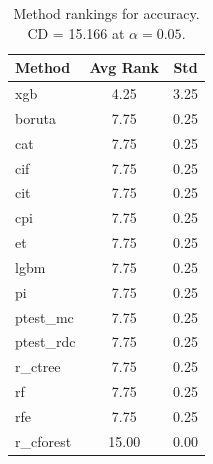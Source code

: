 \begin{table}[h]
\centering
\caption{Method rankings for accuracy. CD = 15.166 at $\alpha=0.05$.}
\label{tab:ranks_accuracy}
\begin{tabular}{lcc}
\toprule
Method & Avg Rank & Std \\
\midrule
xgb & 4.25 & 3.25 \\
boruta & 7.75 & 0.25 \\
cat & 7.75 & 0.25 \\
cif & 7.75 & 0.25 \\
cit & 7.75 & 0.25 \\
cpi & 7.75 & 0.25 \\
et & 7.75 & 0.25 \\
lgbm & 7.75 & 0.25 \\
pi & 7.75 & 0.25 \\
ptest_mc & 7.75 & 0.25 \\
ptest_rdc & 7.75 & 0.25 \\
r_ctree & 7.75 & 0.25 \\
rf & 7.75 & 0.25 \\
rfe & 7.75 & 0.25 \\
r_cforest & 15.00 & 0.00 \\
\bottomrule
\end{tabular}
\end{table}
